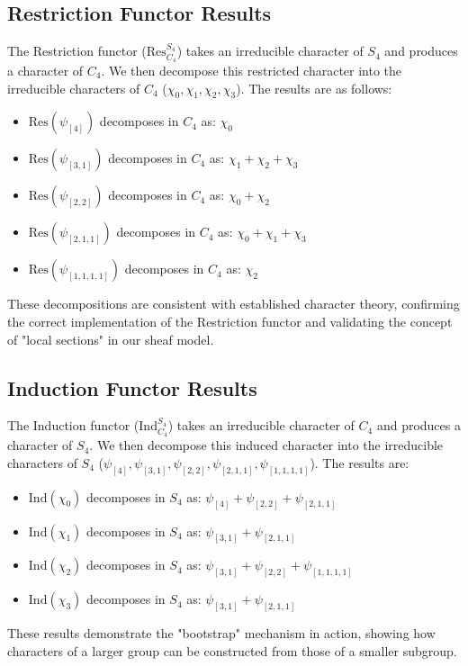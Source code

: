 \documentclass[11pt]{article}
\theoremstyle{definition}
\theoremstyle{remark}
\begin{document}
\subsection{Restriction Functor Results}
The Restriction functor ($\text{Res}^{S_4}_{C_4}$) takes an irreducible character of $S_4$ and produces a character of $C_4$. We then decompose this restricted character into the irreducible characters of $C_4$ ($\chi_0, \chi_1, \chi_2, \chi_3$). The results are as follows:
\begin{itemize}
    \item $\text{Res}(\psi_{[4]})$ decomposes in $C_4$ as: $\chi_0$
    \item $\text{Res}(\psi_{[3, 1]})$ decomposes in $C_4$ as: $\chi_1 + \chi_2 + \chi_3$
    \item $\text{Res}(\psi_{[2, 2]})$ decomposes in $C_4$ as: $\chi_0 + \chi_2$
    \item $\text{Res}(\psi_{[2, 1, 1]})$ decomposes in $C_4$ as: $\chi_0 + \chi_1 + \chi_3$
    \item $\text{Res}(\psi_{[1, 1, 1, 1]})$ decomposes in $C_4$ as: $\chi_2$
\end{itemize}
These decompositions are consistent with established character theory, confirming the correct implementation of the Restriction functor and validating the concept of "local sections" in our sheaf model.

\subsection{Induction Functor Results}
The Induction functor ($\text{Ind}^{S_4}_{C_4}$) takes an irreducible character of $C_4$ and produces a character of $S_4$. We then decompose this induced character into the irreducible characters of $S_4$ ($\psi_{[4]}, \psi_{[3,1]}, \psi_{[2,2]}, \psi_{[2,1,1]}, \psi_{[1,1,1,1]}$). The results are:
\begin{itemize}
    \item $\text{Ind}(\chi_0)$ decomposes in $S_4$ as: $\psi_{[4]} + \psi_{[2, 2]} + \psi_{[2, 1, 1]}$
    \item $\text{Ind}(\chi_1)$ decomposes in $S_4$ as: $\psi_{[3, 1]} + \psi_{[2, 1, 1]}$
    \item $\text{Ind}(\chi_2)$ decomposes in $S_4$ as: $\psi_{[3, 1]} + \psi_{[2, 2]} + \psi_{[1, 1, 1, 1]}$
    \item $\text{Ind}(\chi_3)$ decomposes in $S_4$ as: $\psi_{[3, 1]} + \psi_{[2, 1, 1]}$
\end{itemize}
These results demonstrate the "bootstrap" mechanism in action, showing how characters of a larger group can be constructed from those of a smaller subgroup.
\end{document}
